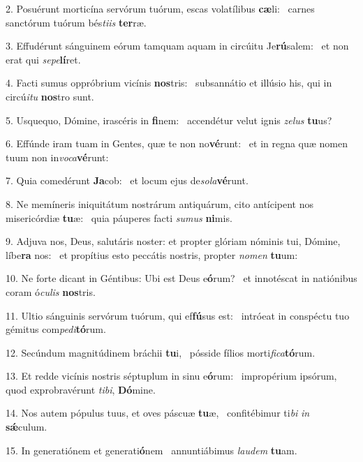 2. Posuérunt morticína servórum tuórum, escas volatílibus \textbf{cæ}li: \ast\  carnes sanctórum tuórum bés\textit{ti}\textit{is} \textbf{ter}ræ.\

3. Effudérunt sánguinem eórum tamquam aquam in circúitu Je\textbf{rú}salem: \ast\  et non erat qui \textit{se}\textit{pe}\textbf{lí}ret.\

4. Facti sumus oppróbrium vicínis \textbf{nos}tris: \ast\  subsannátio et illúsio his, qui in circú\textit{i}\textit{tu} \textbf{nos}tro sunt.\

5. Usquequo, Dómine, irascéris in \textbf{fi}nem: \ast\  accendétur velut ignis \textit{ze}\textit{lus} \textbf{tu}us?\

6. Effúnde iram tuam in Gentes, quæ te non no\textbf{vé}runt: \ast\  et in regna quæ nomen tuum non in\textit{vo}\textit{ca}\textbf{vé}runt:\

7. Quia comedérunt \textbf{Ja}cob: \ast\  et locum ejus de\textit{so}\textit{la}\textbf{vé}runt.\

8. Ne memíneris iniquitátum nostrárum antiquárum, cito antícipent nos misericórdiæ \textbf{tu}æ: \ast\  quia páuperes facti \textit{su}\textit{mus} \textbf{ni}mis.\

9. Adjuva nos, Deus, salutáris noster: et propter glóriam nóminis tui, Dómine, líbe\textbf{ra} nos: \ast\  et propítius esto peccátis nostris, propter \textit{no}\textit{men} \textbf{tu}um:\

10. Ne forte dicant in Géntibus: Ubi est Deus e\textbf{ó}rum? \ast\  et innotéscat in natiónibus coram ó\textit{cu}\textit{lis} \textbf{nos}tris.\

11. Ultio sánguinis servórum tuórum, qui ef\textbf{fú}sus est: \ast\  intróeat in conspéctu tuo gémitus com\textit{pe}\textit{di}\textbf{tó}rum.\

12. Secúndum magnitúdinem bráchii \textbf{tu}i, \ast\  pósside fílios morti\textit{fi}\textit{ca}\textbf{tó}rum.\

13. Et redde vicínis nostris séptuplum in sinu e\textbf{ó}rum: \ast\  impropérium ipsórum, quod exprobravérunt \textit{ti}\textit{bi}, \textbf{Dó}mine.\

14. Nos autem pópulus tuus, et oves páscuæ \textbf{tu}æ, \ast\  confitébimur ti\textit{bi} \textit{in} \textbf{sǽ}culum.\

15. In generatiónem et generati\textbf{ó}nem \ast\  annuntiábimus \textit{lau}\textit{dem} \textbf{tu}am.\

